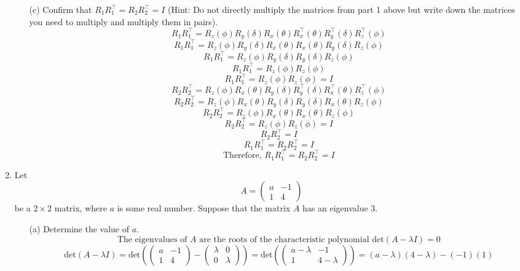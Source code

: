 \documentclass[a3paper,12pt]{extarticle} %
\begin{document}
\begin{enumerate}
\begin{enumerate}
        \item[(c)] Confirm that \(R_1 R_1^\top = R_2 R_2^\top = I\) (Hint: Do not directly multiply the matrices from part 1 above but write down the matrices you need to multiply and multiply them in pairs).
        \[
            R_1 R_1^\top = R_z(\phi)R_y(\delta)R_x(\theta)R_x^\top(\theta)R_y^\top(\delta)R_z^\top(\phi)
        \]
        \[
            R_1 R_1^\top = R_z(\phi)R_y(\delta)R_x(\theta)R_x(\theta)R_y(\delta)R_z(\phi)
        \]
        \[
            R_1 R_1^\top = R_z(\phi)R_y(\delta)R_y(\delta)R_z(\phi)
        \]
        \[
            R_1 R_1^\top = R_z(\phi)R_z(\phi)
        \]
        \[
            R_1 R_1^\top = R_z(\phi)R_z(\phi) = I
        \]
        \[
            R_2 R_2^\top = R_z(\phi)R_x(\theta)R_y(\delta)R_y^\top(\delta)R_x^\top(\theta)R_z^\top(\phi)
        \]
        \[
            R_2 R_2^\top = R_z(\phi)R_x(\theta)R_y(\delta)R_y(\delta)R_x(\theta)R_z(\phi)
        \]
        \[
            R_2 R_2^\top = R_z(\phi)R_x(\theta)R_x(\theta)R_z(\phi)
        \]
        \[
            R_2 R_2^\top = R_z(\phi)R_z(\phi) = I
        \]
        \[
            R_2 R_2^\top = I
        \]
        \[
            R_1 R_1^\top = R_2 R_2^\top = I
        \]
        \[
            \text{Therefore, } R_1 R_1^\top = R_2 R_2^\top = I
        \]
    \end{enumerate}
    \item Let
    \[
    A = \begin{pmatrix} a & -1 \\ 1 & 4 \end{pmatrix}
    \]
    be a \(2 \times 2\) matrix, where \(a\) is some real number. Suppose that the matrix \(A\) has an eigenvalue 3.
    \begin{enumerate}
        \item[(a)] Determine the value of \(a\).
        \[
            \text{The eigenvalues of } A \text{ are the roots of the characteristic polynomial } \text{det}(A - \lambda I) = 0
        \]
        \[
            \text{det}(A - \lambda I) = \text{det}\left( \begin{pmatrix} a & -1 \\ 1 & 4 \end{pmatrix} - \begin{pmatrix} \lambda & 0 \\ 0 & \lambda \end{pmatrix} \right) = \text{det}\left( \begin{pmatrix} a - \lambda & -1 \\ 1 & 4 - \lambda \end{pmatrix} \right) = (a - \lambda)(4 - \lambda) - (-1)(1)
\]
\end{enumerate}
\end{enumerate}
\end{document}

